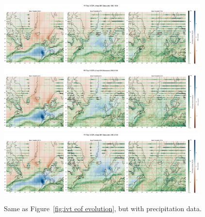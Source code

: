 \begin{figure}
  \begin{center}
    \includegraphics[width=0.95\textwidth]{figures/pr_spat_patterns_hexbin_18501899_ssp585_50seasons.png}
    \includegraphics[width=0.95\textwidth]{figures/pr_spat_patterns_hexbin_20502100_ssp126_50seasons.png}
    \includegraphics[width=0.95\textwidth]{figures/pr_spat_patterns_hexbin_20502100_ssp585_50seasons.png}
  \end{center}
  \caption{Same as Figure~\ref{fig:ivt eof evolution}, but with precipitation data.}\label{fig:pr eof evolution}
\end{figure}

